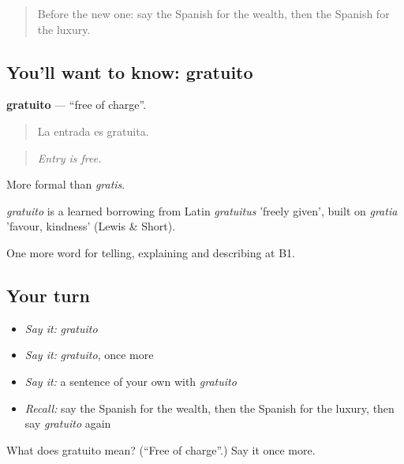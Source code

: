 \begin{quote}
Before the new one: say the Spanish for the wealth, then the Spanish for the luxury.
\end{quote}

\subsection*{You'll want to know: gratuito}
\textbf{gratuito} — \textquotedblleft{}free of charge\textquotedblright{}.

\begin{quote}
La entrada es gratuita.
\end{quote}

\begin{quote}
\emph{Entry is free.}
\end{quote}

More formal than \emph{gratis}.

\begin{cousinweb}
\emph{gratuito} is a learned borrowing from Latin \emph{gratuitus} 'freely given', built on \emph{gratia} 'favour, kindness' (Lewis \& Short).
\end{cousinweb}

\begin{grammarlens}[title={What you've built}]
One more word for telling, explaining and describing at B1.
\end{grammarlens}

\subsection*{Your turn}
\begin{itemize}
\raggedright
  \item \emph{Say it:} \emph{gratuito}
  \item \emph{Say it:} \emph{gratuito}, once more
  \item \emph{Say it:} a sentence of your own with \emph{gratuito}
  \item \emph{Recall:} say the Spanish for the wealth, then the Spanish for the luxury, then say \emph{gratuito} again
\end{itemize}

\begin{tcolorbox}[breakable,colback=teal!4,colframe=teal!35!black,title={Before you move on}]
What does gratuito mean? (\textquotedblleft{}Free of charge\textquotedblright{}.) Say it once more.
\end{tcolorbox}
